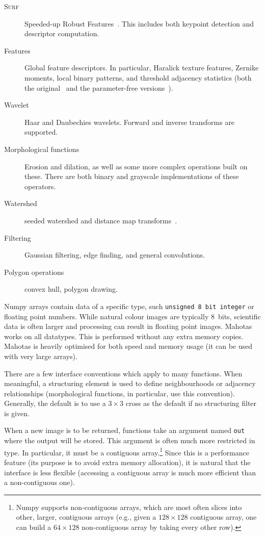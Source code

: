 \documentclass{scrartcl}
\let\code\texttt
\begin{document}
\begin{description}
\item[\textsc{Surf}] Speeded-up Robust Features~\citep{eth_biwi_00517}. This
includes both keypoint detection and descriptor computation.
\item[Features] Global feature descriptors. In particular, Haralick texture
features, Zernike moments, local binary patterns, and threshold adjacency
statistics (both the original~\citep{Hamilton2007} and the parameter-free
versions~\citep{Coelho2010}).
\item[Wavelet] Haar and Daubechies wavelets. Forward and inverse transforms are
supported.
\item[Morphological functions] Erosion and dilation, as well as some more
complex operations built on these. There are both binary and grayscale
implementations of these operators.
\item[Watershed] seeded watershed and distance map
transforms~\citep{felzenszwalb}.
\item[Filtering] Gaussian filtering, edge finding, and general convolutions.
\item[Polygon operations] convex hull, polygon drawing.
\end{description}

Numpy arrays contain data of a specific type, such \code{unsigned 8 bit
integer} or floating point numbers. While natural colour images are typically
8~bits, scientific data is often larger and processing can result in floating
point images. Mahotas works on all datatypes. This is performed without any
extra memory copies. Mahotas is heavily optimised for both speed and memory
usage (it can be used with very large arrays).

There are a few interface conventions which apply to many functions. When
meaningful, a structuring element is used to define neighbourhoods or adjacency
relationships (morphological functions, in particular, use this convention).
Generally, the default is to use a $3 \times 3$ cross as the default if no
structuring filter is given.

When a new image is to be returned, functions take an argument named \code{out}
where the output will be stored. This argument is often much more restricted in
type. In particular, it must be a contiguous array.\footnote{Numpy supports
non-contiguous arrays, which are most often slices into other, larger,
contiguous arrays (e.g., given a $128 \times 128$ contiguous array, one can
build a $64 \times 128$ non-contiguous array by taking every other row).} Since
this is a performance feature (its purpose is to avoid extra memory
allocation), it is natural that the interface is less flexible (accessing a
contiguous array is much more efficient than a non-contiguous one).
\end{document}
